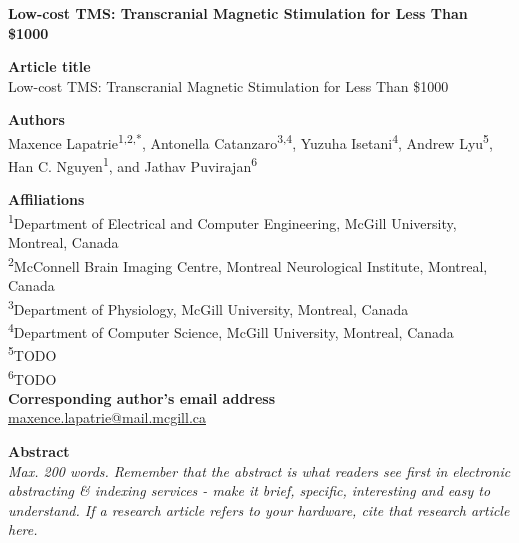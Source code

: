 \documentclass[11pt, letterpaper]{article}
\begin{document}
\begin{flushleft}

{\Huge \bf Low-cost TMS: Transcranial Magnetic Stimulation for Less Than \$1000}\\
\vskip 0.5cm


\setlength{\parindent}{0pt}
\setlength{\parskip}{10pt}

\textbf{Article title}\\ Low-cost TMS: Transcranial Magnetic Stimulation for Less Than \$1000

\textbf{Authors}\\ Maxence Lapatrie\textsuperscript{1,2,*}, Antonella Catanzaro\textsuperscript{3,4}, Yuzuha Isetani\textsuperscript{4}, 
Andrew Lyu\textsuperscript{5}, Han C. Nguyen\textsuperscript{1}, and Jathav Puvirajan\textsuperscript{6}

\textbf{Affiliations}\\ 
\textsuperscript{1}Department of Electrical and Computer Engineering, McGill University, Montreal, Canada\\
\textsuperscript{2}McConnell Brain Imaging Centre, Montreal Neurological Institute, Montreal, Canada\\
\textsuperscript{3}Department of Physiology, McGill University, Montreal, Canada\\
\textsuperscript{4}Department of Computer Science, McGill University, Montreal, Canada\\
\textsuperscript{5}TODO\\
\textsuperscript{6}TODO\\

\textbf{Corresponding author’s email address}\\
\href{mailto:maxence.lapatrie@mail.mcgill.ca}{maxence.lapatrie@mail.mcgill.ca}

\textbf{Abstract}\\ \textit{Max. 200 words. Remember that the abstract is what readers see first in electronic abstracting \& indexing services - make it brief, specific, interesting and easy to understand. If a research article refers to your hardware, cite that research article here.}


\end{flushleft}
\end{document}
